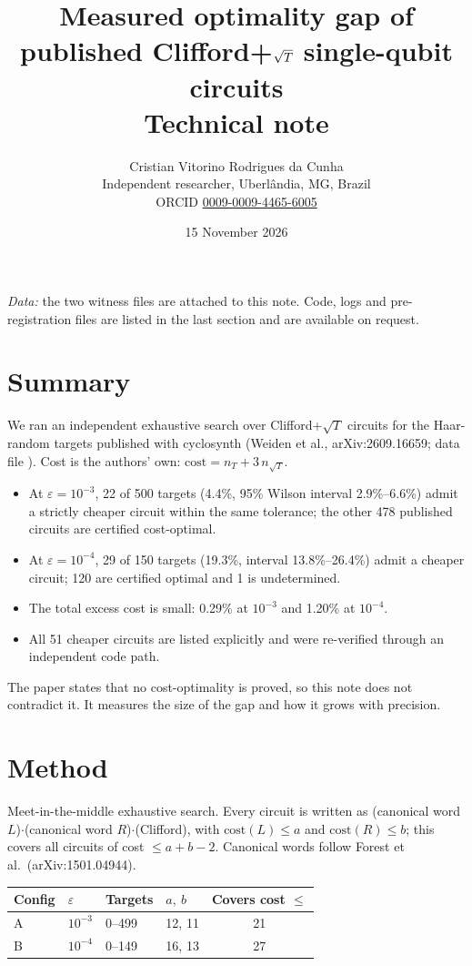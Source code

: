 \documentclass[11pt,a4paper]{article}
\title{Measured optimality gap of published Clifford+$\sqT$ single-qubit circuits\\[2pt]
\large Technical note}
\author{Cristian Vitorino Rodrigues da Cunha\\
\small Independent researcher, Uberl\^andia, MG, Brazil\\
\small ORCID \href{https://orcid.org/0009-0009-4465-6005}{0009-0009-4465-6005}}
\date{15 November 2026}
\newcommand{\sqT}{\sqrt{T}}
\newcommand{\file}[1]{\texttt{\detokenize{#1}}}
\begin{document}
\maketitle

\noindent\textit{Data:} the two witness files are attached to this note. Code, logs and
pre-registration files are listed in the last section and are available on request.

\section*{Summary}

We ran an independent exhaustive search over Clifford+$\sqT$ circuits for the Haar-random targets
published with cyclosynth (Weiden et al., arXiv:2609.16659; data file \file{u3.csv}). Cost is the
authors' own: $\text{cost} = n_T + 3\,n_{\sqT}$.

\begin{itemize}
\item At $\varepsilon = 10^{-3}$, 22 of 500 targets (4.4\%, 95\% Wilson interval 2.9\%--6.6\%) admit a
  strictly cheaper circuit within the same tolerance; the other 478 published circuits are certified
  cost-optimal.
\item At $\varepsilon = 10^{-4}$, 29 of 150 targets (19.3\%, interval 13.8\%--26.4\%) admit a cheaper
  circuit; 120 are certified optimal and 1 is undetermined.
\item The total excess cost is small: 0.29\% at $10^{-3}$ and 1.20\% at $10^{-4}$.
\item All 51 cheaper circuits are listed explicitly and were re-verified through an independent code
  path.
\end{itemize}

The paper states that no cost-optimality is proved, so this note does not contradict it. It measures
the size of the gap and how it grows with precision.

\section*{Method}

Meet-in-the-middle exhaustive search. Every circuit is written as
(canonical word $L$)$\cdot$(canonical word $R$)$\cdot$(Clifford), with $\text{cost}(L) \le a$ and
$\text{cost}(R) \le b$; this covers all circuits of cost $\le a + b - 2$. Canonical words follow
Forest et al.\ (arXiv:1501.04944).

\begin{center}
\begin{tabular}{llllc}
\toprule
Config & $\varepsilon$ & Targets & $a,\ b$ & Covers cost $\le$ \\
\midrule
A & $10^{-3}$ & 0--499 & 12, 11 & 21 \\
B & $10^{-4}$ & 0--149 & 16, 13 & 27 \\
\bottomrule
\end{tabular}
\end{center}
\end{document}
